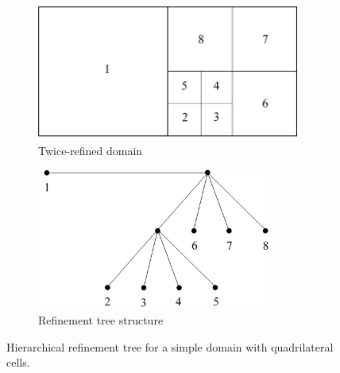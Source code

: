 \begin{figure}
\centering
{
	\begin{subfigure}[b]{0.48\textwidth}
		\centering
		\includegraphics[width=0.95\textwidth]{figures/sec_Sn/Quad_tree_domain.png}
		\caption{Twice-refined domain}
		\label{fig::Sn_Solution_Spatial_AMR_tree_dom}
	\end{subfigure}
}
	\hfill
{
	\begin{subfigure}[b]{0.48\textwidth}
		\centering
		\includegraphics[width=0.85\textwidth]{figures/sec_Sn/Quad_tree_structure.png}
		\caption{Refinement tree structure}
		\label{fig::Sn_Solution_Spatial_AMR_tree_struct}
	\end{subfigure}
}
\caption[Quadrilateral refinement tree]{Hierarchical refinement tree for a simple domain with quadrilateral cells.}
\label{fig::Sn_Solution_Spatial_AMR_tree}
\end{figure}

